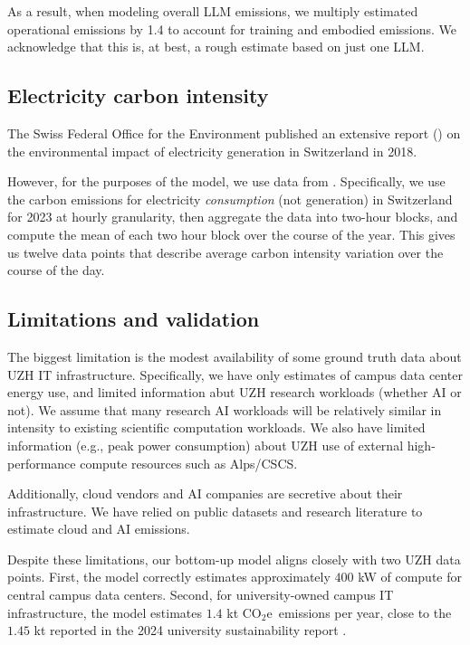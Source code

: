 \documentclass[11pt]{article}
\newcommand{\coe}{CO$_2$e}
\begin{document}
As a result, when modeling overall LLM emissions, we multiply estimated operational emissions by 1.4 to account for training and embodied emissions. We acknowledge that this is, at best, a rough estimate based on just one LLM.

\subsection{Electricity carbon intensity}

The Swiss Federal Office for the Environment published an extensive report (\cite{krebs2018umweltbilanz}) on the environmental impact of electricity generation in Switzerland in 2018.

However, for the purposes of the model, we use data from \textcite{electricitymaps}. Specifically, we use the carbon emissions for electricity {\em consumption} (not generation) in Switzerland for 2023 at hourly granularity, then aggregate the data into two-hour blocks, and compute the mean of each two hour block over the course of the year. This gives us twelve data points that describe average carbon intensity variation over the course of the day.

\subsection{Limitations and validation}

The biggest limitation is the modest availability of some ground truth data about UZH IT infrastructure. Specifically, we have only estimates of campus data center energy use, and limited information abut UZH research workloads (whether AI or not). We assume that many research AI workloads will be relatively similar in intensity to existing scientific computation workloads. We also have limited information (e.g., peak power consumption) about UZH use of external high-performance compute resources such as Alps/CSCS.

Additionally, cloud vendors and AI companies are secretive about their infrastructure. We have relied on public datasets and research literature to estimate cloud and AI emissions.

Despite these limitations, our bottom-up model aligns closely with two UZH data points. First, the model correctly estimates approximately $400$ kW of compute for central campus data centers. Second, for university-owned campus IT infrastructure, the model estimates $1.4$ kt \coe\ emissions per year, close to the $1.45$ kt reported in the 2024 university sustainability report \cite{uzh:sustainability:report}.
\end{document}
